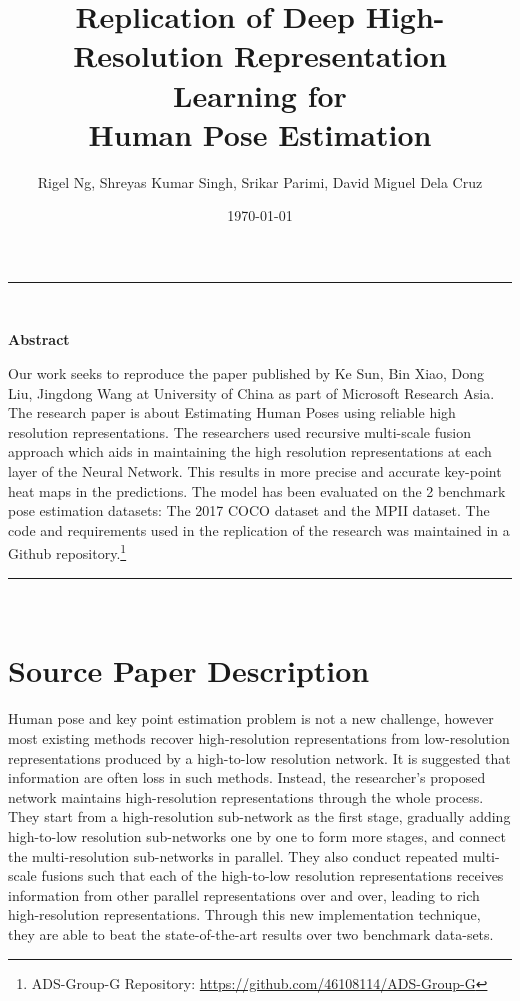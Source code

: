 \documentclass[a4paper,12pt]{article}
\title{\textbf{%
Replication of Deep High-Resolution Representation Learning for \\ Human Pose Estimation}}
\author{Rigel Ng,  Shreyas Kumar Singh, Srikar Parimi, David Miguel Dela Cruz}
\date{\today}
\begin{document}
\maketitle

\noindent\rule{16.5cm}{0.4pt}\\

\begin{center} \textbf{\large Abstract} \end{center}
 Our work seeks to reproduce the paper published by Ke Sun, Bin Xiao, Dong Liu, Jingdong  Wang at University of China as part of Microsoft Research Asia\autocite{DBLP:journals/corr/abs-1902-09212}. The research paper is about Estimating Human Poses using reliable high resolution representations. The researchers used recursive multi-scale fusion approach which aids in maintaining the high resolution representations at each layer of the Neural Network. This results in more precise and accurate key-point heat maps in the predictions. The model has been evaluated on the 2 benchmark pose estimation datasets: The 2017 COCO dataset and the MPII dataset. The code and requirements used in the replication of the research was maintained in a Github repository.\footnote{ADS-Group-G Repository: \url{https://github.com/46108114/ADS-Group-G}}

\noindent\rule{16.5cm}{0.4pt}\\


\section{Source Paper Description}

Human pose and key point estimation problem is not a new challenge, however most existing methods recover high-resolution representations from low-resolution representations produced by a high-to-low resolution network. It is suggested that information are often loss in such methods. Instead, the researcher's proposed network maintains high-resolution representations through the whole process. They start from a high-resolution sub-network as the first stage, gradually adding high-to-low resolution sub-networks one by one to form more stages, and connect the multi-resolution sub-networks in parallel. They also conduct repeated multi-scale fusions such that each of the high-to-low resolution representations receives information from other parallel representations over and over, leading to rich high-resolution representations. Through this new implementation technique, they are able to beat the state-of-the-art results over two benchmark data-sets. 
\end{document}
